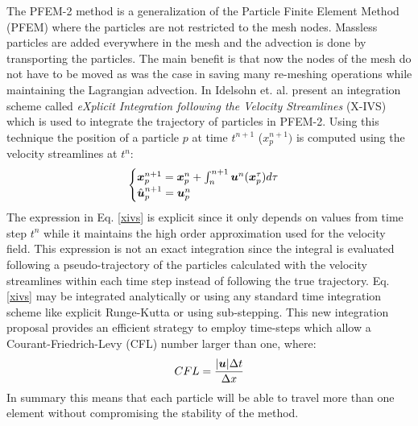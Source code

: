 The PFEM-2 method is a generalization of the Particle Finite Element Method (PFEM) \cite{sergio:pfem} where the particles are not restricted to the mesh nodes. Massless particles are added everywhere in the mesh and the advection is done by transporting the particles. The main benefit is that now the nodes of the mesh do not have to be moved as was the case in \cite{sergio:pfem} saving many re-meshing operations while maintaining the Lagrangian advection. In \cite{sergio:xivs1} Idelsohn et. al. present an integration scheme called {\em eXplicit Integration following the Velocity Streamlines} (X-IVS) which is used to integrate the trajectory of particles in PFEM-2. Using this technique the position of a particle $p$ at time $t^{n+1}$ ($x_p^{n+1})$ is computed using the velocity streamlines at $t^n$:
%
\begin{equation}\label{xivs}
  \begin{cases}
    \boldsymbol{x}_p^{n+1}=\boldsymbol{x}_p^n+\int_n^{n+1} \boldsymbol{u}^n(\boldsymbol{x}_p^\tau) d\tau\\
    \hat{\boldsymbol{u}}^{n+1}_p=\boldsymbol{u}_p^n
  \end{cases}
\end{equation}
%
The expression in Eq. \ref{xivs} is explicit since it only depends on values from time step $t^n$ while it maintains the high order approximation used for the velocity field. This expression is not an exact integration since the integral is evaluated following a pseudo-trajectory of the particles calculated with the velocity streamlines within each time step instead of following the true trajectory. Eq. \ref{xivs} may be integrated analytically or using any standard time integration scheme like explicit Runge-Kutta or using sub-stepping. This new integration proposal provides an efficient strategy to employ time-steps which allow a Courant-Friedrich-Levy (CFL) number larger than one, where:
%
\begin{equation}
  CFL=\frac{|\boldsymbol{u}|\Delta t}{\Delta x}
\end{equation}
%
In summary this means that each particle will be able to travel more than one element without compromising the stability of the method.

